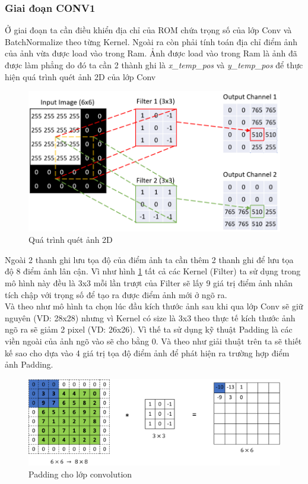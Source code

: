 \subsubsection{Giai đoạn CONV1}
Ở giai đoạn ta cần điều khiển địa chỉ của ROM chứa trọng số của lớp Conv và BatchNormalize theo từng Kernel. Ngoài ra còn phải tính toán địa chỉ điểm ảnh của ảnh vừa được load vào trong Ram. Ảnh được load vào trong Ram là ảnh đã được làm phẳng do đó ta cần 2 thành ghi là \textit{x\_temp\_pos} và \textit{y\_temp\_pos} để thực hiện quá trình quét ảnh 2D của lớp Conv
\begin{figure}[H]
    \centering
    \includegraphics[width=0.75\linewidth]{Images/ohlc_filter.png}
    \caption{Quá trình quét ảnh 2D}
    \label{fig:filter}
\end{figure}
Ngoài 2 thanh ghi lưu tọa độ của điểm ảnh ta cần thêm 2 thanh ghi để lưu tọa độ 8 điểm ảnh lân cận. Vì như hình \ref{fig:filter} tất cả các Kernel (Filter) ta sử dụng trong mô hình này đều là 3x3 mỗi lần trượt của Filter sẽ lấy 9 giá trị điểm ảnh nhân tích chập với trọng số để tạo ra được điểm ảnh mới ở ngõ ra. \\
Và theo như mô hình ta chọn lúc đầu kích thước ảnh sau khi qua lớp Conv sẽ giữ nguyên (VD: 28x28) nhưng vì Kernel có size là 3x3 theo thực tế kích thước ảnh ngõ ra sẽ giảm 2 pixel (VD: 26x26). Vì thế ta sử dụng kỹ thuật Padding là các viền ngoài của ảnh ngõ vào sẽ cho bằng 0. Và theo như giải thuật trên ta sẽ thiết kế sao cho dựa vào 4 giá trị tọa độ điểm ảnh để phát hiện ra trường hợp điểm ảnh Padding.
\begin{figure}[H]
    \centering
    \includegraphics[width=0.9\linewidth]{Images/R.png}
    \caption{Padding cho lớp convolution}
    \label{fig:enter-label}
\end{figure}

